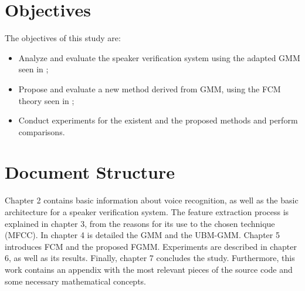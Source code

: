 \section{Objectives}

The objectives of this study are:

\begin{itemize}\itemsep0pt
    \item Analyze and evaluate the speaker verification system using the adapted GMM seen in \cite{reynolds.quatieri.dunn.2000};
    \item Propose and evaluate a new method derived from GMM, using the FCM theory seen in \cite{gao.zhou.pu.2013};
    \item Conduct experiments for the existent and the proposed methods and perform comparisons.
\end{itemize}

\section{Document Structure}

Chapter 2 contains basic information about voice recognition, as well as the basic architecture for a speaker verification system. The feature extraction process is explained in chapter 3, from the reasons for its use to the chosen technique (MFCC). In chapter 4 is detailed the GMM and the UBM-GMM. Chapter 5 introduces FCM and the proposed FGMM. Experiments are described in chapter 6, as well as its results. Finally, chapter 7 concludes the study. Furthermore, this work contains an appendix with the most relevant pieces of the source code and some necessary mathematical concepts.